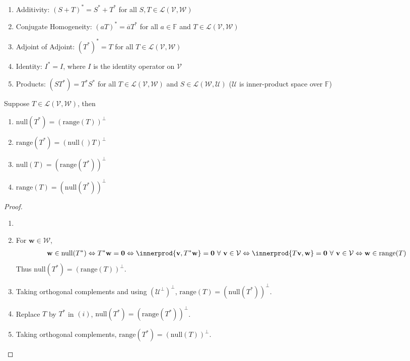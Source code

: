 \begin{remark} 
\begin{enumerate}[label=\roman*.]
\setlength{\itemsep}{0pt}
\item Additivity: $(S + T)^* = S^* + T^*$ for all $S, T \in \mathcal{L}(\mathcal{V}, \mathcal{W})$
\item Conjugate Homogeneity: $(aT)^* = \overline{a}T^*$ for all $a \in \mathbb{F}$ and $T \in \mathcal{L}(\mathcal{V}, \mathcal{W})$
\item Adjoint of Adjoint: $(T^*)^* = T$ for all $T \in \mathcal{L}(\mathcal{V}, \mathcal{W})$
\item Identity: $I^* = I$, where $I$ is the identity operator on $\mathcal{V}$
\item Products: $(ST^*) = T^* S^*$ for all $T \in \mathcal{L}(\mathcal{V}, \mathcal{W})$ and $S \in \mathcal{L}(\mathcal{W}, \mathcal{U})$ ($\mathcal{U}$ is inner-product space over $\mathbb{F}$)
\end{enumerate}
\end{remark}

\begin{proposition} Suppose $T \in \mathcal{L}(\mathcal{V}, \mathcal{W})$, then
\begin{enumerate}[label=\roman*.]
\setlength{\itemsep}{0pt}
\item $\text{null}(T^*) = (\text{range}(T))^{\perp}$
\item $\text{range}(T^*) = (\text{null}()T)^{\perp}$
\item $\text{null}(T) = (\text{range}(T^*))^{\perp}$
\item $\text{range}(T) = (\text{null}(T^*))^{\perp}$
\end{enumerate}
\begin{proof}
\begin{enumerate}[label=\roman*.]
\setlength{\itemsep}{0pt}
\item[]
\item[$(i)$] For $\mathbf{w} \in \mathcal{W}$,
\begin{align}
\mathbf{w} \in \text{null}(T^*) \Leftrightarrow T^* \mathbf{w} = \mathbf{0} \Leftrightarrow \innerprod{\mathbf{v}, T^* \mathbf{w}} = \mathbf{0} \ \forall \ \mathbf{v} \in \mathcal{V} \Leftrightarrow \innerprod{T \mathbf{v}, \mathbf{w}} = \mathbf{0} \ \forall \ \mathbf{v} \in \mathcal{V} \Leftrightarrow \mathbf{w} \in \text{range}(T) \nonumber
\end{align}
Thus $\text{null}(T^*) = (\text{range}(T))^{\perp}$.
\item[$(iv)$] Taking orthogonal complements and using $(\mathcal{U}^{\perp})^{\perp}$, $\text{range}(T) = (\text{null}(T^*))^{\perp}$.
\item[$(iii)$] Replace $T$ by $T^*$ in $(i)$, $\text{null}(T^*) = (\text{range}(T^*))^{\perp}$.
\item[$(ii)$] Taking orthogonal complements, $\text{range}(T^*) = (\text{null}(T))^{\perp}$.
\end{enumerate}
\end{proof}
\end{proposition}

